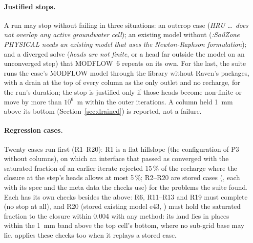 \paragraph{Justified stops.} A run may stop without failing in three situations: an outcrop case (\emph{HRU \dots\ does
not overlap any active groundwater cell}); an existing model without  (\emph{:SoilZone PHYSICAL needs an
existing model that uses the Newton-Raphson formulation}); and a diverged solve (\emph{heads are not finite}, or a head
far outside the model on an unconverged step) that MODFLOW~6 repeats on its own. For the last, the suite runs the case's
MODFLOW model through the library without Raven's packages, with a drain at the top of every column as the only outlet
and no recharge, for the run's duration; the stop is justified only if those heads become non-finite or move by more
than $10^6$~m within the outer iterations. A column held 1~mm above its bottom (Section~\ref{sec:drained}) is reported,
not a failure.

\paragraph{Regression cases.} Twenty cases run first (R1--R20): R1 is a flat hillslope (the configuration of P3
without columns), on which an interface that passed as converged with the saturated fraction of an earlier iterate
rejected 15\,\% of the recharge where the closure at the step's heads allows at most 5\,\%; R2--R20 are stored cases
(, each with its spec and the meta data the checks use) for the problems the suite found. Each has
its own checks besides the above: R6, R11--R13 and R19 must complete (no stop at all), and R20 (stored existing model e43,
) must hold the saturated fraction to the closure within 0.004 with any method: its land lies in
places within the 1~mm band above the top cell's bottom, where no sub-grid base may lie.  applies these checks
too when it replays a stored case.

